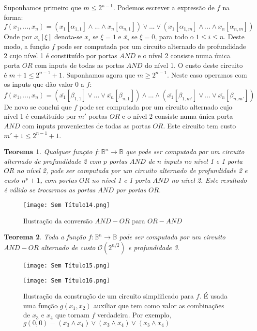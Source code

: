 \documentclass[10pt,a4paper]{report}
\newtheorem{theorem}{Teorema}
\begin{document}
Suponhamos primeiro que $m \leq 2^{n-1}$. Podemos escrever a expressão de $f$ na forma:
$$
f(x_1, ..., x_n) = (x_1[\alpha_{1,1}] \land ... \land x_n[\alpha_{n,1}]) \lor ... \lor (x_1[\alpha_{1,m}] \land ... \land x_n[\alpha_{n,m}])
$$
Onde por $x_i[\xi]$ denota-se $x_i$ se $\xi = 1$ e $\overline{x_i}$ se $\xi = 0$, para todo o $1 \leq i \leq n$. Deste modo, a função $f$ pode ser computada por um circuito alternado de profundidade 2 cujo nível 1 é constituído por portas $AND$ e o nível 2 consiste numa única porta $OR$ com inputs de todas as portas $AND$ do nível 1. O custo deste circuito é $m + 1 \leq 2^{n-1} + 1$. Suponhamos agora que $m \geq 2^{n-1}$. Neste caso operamos com os inputs que dão valor 0 a $f$:
$$
f(x_1, ..., x_n) = (\overline{x_1}[\beta_{1,1}] \lor ... \lor \overline{x_n}[\beta_{n,1}]) \land ... \land (\overline{x_1}[\beta_{1,m'}] \lor ... \lor \overline{x_n}[\beta_{n,m'}])
$$
De novo se conclui que $f$ pode ser computada por um circuito alternado cujo nível 1 é constituído por $m'$ portas $OR$ e o nível 2 consiste numa única porta $AND$ com inputs provenientes de todas as portas $OR$. Este circuito tem custo $m' + 1 \leq 2^{n-1} + 1$.
\begin{theorem}
Qualquer função $f: \mathbb{B}^n \rightarrow \mathbb{B}$ que pode ser computada por um circuito alternado de profundidade 2 com $p$ portas $AND$ de $n$ inputs no nível 1 e 1 porta $OR$ no nível 2, pode ser computada por um circuito alternado de profundidade 2 e custo $n^p + 1$, com portas $OR$ no nível 1 e 1 porta $AND$ no nível 2. Este resultado é válido se trocarmos as portas $AND$ por portas $OR$.
\end{theorem}
\begin{figure}[H]
\centering
\texttt{[image: Sem Título14.png]}
\caption{Ilustração da conversão $AND-OR$ para $OR-AND$}
\end{figure}
\begin{theorem}
Toda a função $f: \mathbb{B}^n \rightarrow \mathbb{B}$ pode ser computada por um circuito $AND-OR$ alternado de custo $\mathcal{O}(2^{n/2})$ e profundidade 3.
\end{theorem}
\begin{figure}[H]
\centering
\texttt{[image: Sem Título15.png]}
\end{figure}
\begin{figure}[H]
\centering
\texttt{[image: Sem Título16.png]}
\caption{Ilustração da construção de um circuito simplificado para $f$. É usada uma função $g(x_1,x_2)$ auxiliar que tem como valor as combinações de $x_3$ e $x_4$ que tornam $f$ verdadeira. Por exemplo, $g(0,0) = (\overline{x_3} \land \overline{x_4}) \lor (x_3 \land \overline{x_4}) \lor (x_3 \land x_4)$}
\end{figure}
\end{document}
